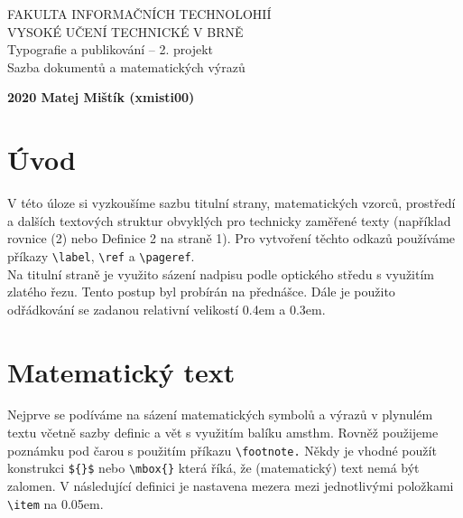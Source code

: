 \documentclass[a4 paper,11pt]{article}
\theoremstyle{definition}
\theoremstyle{plain}
\begin{document}
\begin{titlepage}
\begin{center}

\huge
{FAKULTA INFORMAČNÍCH TECHNOLOHIÍ\\[0.4em]
VYSOKÉ UČENÍ TECHNICKÉ V BRNĚ}\\
\LARGE
{Typografie a publikování -- 2. projekt \\[0.3em] 
Sazba dokumentů a matematických výrazů}

\textbf{{\LARGE 2020 \hfill 
{Matej Mištík (xmisti00)}}}

\end{center}
\end{titlepage}


\twocolumn

 \section*{Úvod}
 
V této úloze si vyzkoušíme sazbu titulní strany, matematických vzorců, prostředí a dalších textových struktur obvyklých pro technicky zaměřené texty (například rovnice (2) nebo Definice 2 na straně 1). Pro vytvoření těchto odkazů používáme příkazy \verb|\label|, \verb|\ref| a \verb|\pageref|. \\
Na titulní straně je využito sázení nadpisu podle optického středu s využitím zlatého řezu. Tento postup byl probírán na přednášce. Dále je použito odřádkování se zadanou relativní velikostí 0.4em a 0.3em.
	


\section{Matematický text}
Nejprve se podíváme na sázení matematických symbolů a výrazů v plynulém textu včetně sazby definic a vět s využitím balíku amsthm. Rovněž použijeme poznámku pod čarou s použitím příkazu \verb|\footnote.| Někdy je vhodné použít konstrukci \verb|${}$| nebo \verb|\mbox{}| která říká, že (matematický) text nemá být zalomen. V následující definici je nastavena mezera mezi jednotlivými položkami \verb|\item| na 0.05em.
\end{document}
